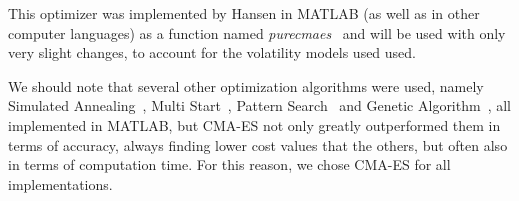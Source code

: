 This optimizer was implemented by Hansen in MATLAB (as well as in other computer languages) as a function named \emph{purecmaes}~\citep{CMAES} and will be used with only very slight changes, to account for the volatility models used used.

We should note that several other optimization algorithms were used, namely Simulated Annealing~\citep{MATLABsa}, Multi Start~\citep{MATLABms}, Pattern Search~\citep{MATLABps} and Genetic Algorithm~\citep{MATLABga}, all implemented in MATLAB, but CMA-ES not only greatly outperformed them in terms of accuracy, always finding lower cost values that the others, but often also in terms of computation time. For this reason, we chose CMA-ES for all implementations.

